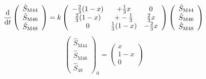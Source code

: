 \documentclass{article}
\begin{document}
\begin{equation}
\frac{\mathrm{d}}{\mathrm{d} t} \left( \begin{array}{c}  \hat{S}_\text{M44} \\ \hat{S}_\text{M46}\\ \hat{S}_\text{M48} 
\end{array}  \right) = k \left( \begin{array}{c c c}   -\frac{2}{3}(1-x) & + \frac{1}{3}x & 0 \\  \frac{2}{3}(1-x) & + -\frac{1}{3} & \frac{2}{3}x \\  0 & \frac{1}{3}(1-x) & -\frac{2}{3}x
\end{array}  \right) \left(\begin{array}{c}  \hat{S}_\text{M44} \\ \hat{S}_\text{M46}\\ \hat{S}_\text{M48} 
\end{array}  \right)
\end{equation}
\begin{equation}
\left(\begin{array}{c}  \hat{S}_\text{M44} \\ \hat{S}_\text{M46}\\ \hat{S}_\text{48} 
\end{array}  \right)_0 = \left(\begin{array}{c}  x \\ 1-x \\ 0 
\end{array}  \right)
\end{equation}
\end{document}
